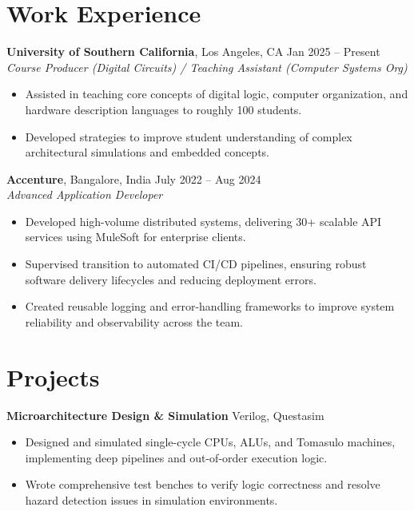 \documentclass[letterpaper,10pt]{article}
\begin{document}
\section*{Work Experience}
\textbf{University of Southern California}, Los Angeles, CA \hfill Jan 2025 -- Present \\
\textit{Course Producer (Digital Circuits) / Teaching Assistant (Computer Systems Org)}
\begin{itemize}[leftmargin=*,noitemsep,topsep=-3pt]
    \item Assisted in teaching core concepts of digital logic, computer organization, and hardware description languages to roughly 100 students.
    \item Developed strategies to improve student understanding of complex architectural simulations and embedded concepts.
\end{itemize}

\textbf{Accenture}, Bangalore, India \hfill July 2022 -- Aug 2024 \\
\textit{Advanced Application Developer}
\begin{itemize}[leftmargin=*,noitemsep,topsep=-3pt]
    \item Developed high-volume distributed systems, delivering 30+ scalable API services using MuleSoft for enterprise clients.
    \item Supervised transition to automated CI/CD pipelines, ensuring robust software delivery lifecycles and reducing deployment errors.
    \item Created reusable logging and error-handling frameworks to improve system reliability and observability across the team.
\end{itemize}

\section*{Projects}
\textbf{Microarchitecture Design \& Simulation} \hfill Verilog, Questasim
\begin{itemize}[leftmargin=*,noitemsep,topsep=-3pt]
    \item Designed and simulated single-cycle CPUs, ALUs, and Tomasulo machines, implementing deep pipelines and out-of-order execution logic.
    \item Wrote comprehensive test benches to verify logic correctness and resolve hazard detection issues in simulation environments.
\end{itemize}
\end{document}
